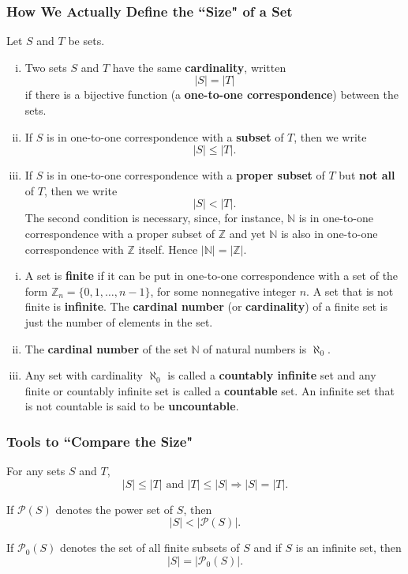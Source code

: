 \subsubsection{How We Actually Define the ``Size" of a Set}
\begin{definition}
	Let $S$ and $T$ be sets.
	\begin{enumerate}[(i)]
		\item Two sets $S$ and $T$ have the same \textbf{cardinality}, written
		\[ |S| = |T| \]
		if there is a bijective function (a \textbf{one-to-one correspondence}) between the sets.
		\item If $S$ is in one-to-one correspondence with a \textbf{subset} of $T$, then we write $$|S| \leq |T|.$$
		\item If $S$ is in one-to-one correspondence with a \textbf{proper subset} of $T$ but \textbf{not all} of $T$, then we write $$|S| < |T|.$$The second condition is necessary, since, for instance, $\mathbb{N}$ is in one-to-one correspondence with a proper subset of $\mathbb{Z}$ and yet $\mathbb{N}$ is also in one-to-one correspondence with $\mathbb{Z}$ itself. Hence $|\mathbb{N}| = |\mathbb{Z}|$.
	\end{enumerate}
\end{definition}
\begin{definition}
	\begin{enumerate}[(i)]
		\item A set is \textbf{finite} if it can be put in one-to-one correspondence with a set of the form $\mathbb{Z}_n = \{0, 1, \ldots, n-1\}$, for some nonnegative integer $n$. A set that is not finite is \textbf{infinite}. The \textbf{cardinal number} (or \textbf{cardinality}) of a finite set is just the number of elements in the set.
		\item The \textbf{cardinal number} of the set $\mathbb{N}$ of natural numbers is $\aleph_0$. 
		\item Any set with cardinality $\aleph_0$ is called a \textbf{countably infinite} set and any finite or countably infinite set is called a \textbf{countable} set. An infinite set that is not countable is said to be \textbf{uncountable}.
	\end{enumerate}
\end{definition}

\subsubsection{Tools to ``Compare the Size"}
\begin{theorem} \label{thm-cardinal-Schroder-Bernstein}
	For any sets $S$ and $T$,
	\[ |S| \leq |T| \text{ and } |T| \leq |S| \Rightarrow |S| = |T|. \]
\end{theorem}
\begin{theorem}
	If $\mathcal{P}(S)$ denotes the power set of $S$, then
	\[ |S| < |\mathcal{P}(S)|. \]
\end{theorem}
\begin{theorem} \label{thm-cardinal-finite-subsets}
	If $\mathcal{P}_0(S)$ denotes the set of all finite subsets of $S$ and if $S$ is an infinite set, then
	\[ |S| = |\mathcal{P}_0(S)|. \]
\end{theorem}

